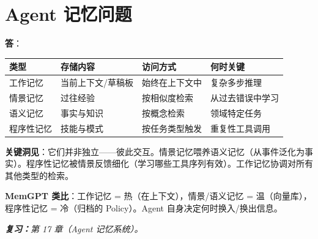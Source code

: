 \section{Agent 记忆问题}
\label{agentic-memory-questions}

\begin{questionbox}
\textbf{答}：

\begin{center}
\begin{tabular}{@{}l l l l@{}}
\toprule
\textbf{类型} & \textbf{存储内容} & \textbf{访问方式} & \textbf{何时关键} \\
\midrule
工作记忆 & 当前上下文/草稿板 & 始终在上下文中 & 复杂多步推理 \\
情景记忆 & 过往经验 & 按相似度检索 & 从过去错误中学习 \\
语义记忆 & 事实与知识 & 按概念检索 & 领域特定任务 \\
程序性记忆 & 技能与模式 & 按任务类型触发 & 重复性工具调用 \\
\bottomrule
\end{tabular}
\end{center}

\textbf{关键洞见}：它们并非独立——彼此交互。情景记忆喂养语义记忆（从事件泛化为事实）。程序性记忆被情景反馈细化（学习哪些工具序列有效）。工作记忆协调对所有其他类型的检索。

\textbf{MemGPT 类比}：工作记忆 = 热（在上下文），情景/语义记忆 = 温（向量库），程序性记忆 = 冷（归档的 Policy）。Agent 自身决定何时换入/换出信息。

\emph{\textbf{复习：}第 17 章（Agent 记忆系统）。}
\end{questionbox}

